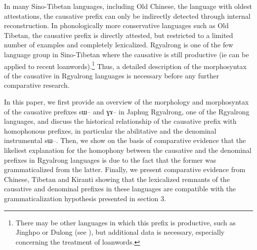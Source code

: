 \documentclass[oldfontcommands,oneside,a4paper,11pt]{article}
\newcommand{\ipa}[1]{{\phon \mbox{#1}}} %
\begin{document}
In many Sino-Tibetan languages, including Old Chinese, the  language with oldest attestations, the causative prefix can only be indirectly detected through internal reconstruction. In  phonologically more conservative languages such as Old Tibetan, the causative prefix is directly attested, but restricted to a limited number of examples and completely lexicalized. Rgyalrong is one of the few language group in Sino-Tibetan where the causative is still productive (ie can be applied to recent loanwords).\footnote{There may be other languages in which this prefix is productive, such as Jinghpo or Dulong (see \citealt[101-2]{sunhk82dulong}), but additional data is necessary, especially concerning the treatment of loanwords.} Thus, a detailed description of the morphosyntax of the causative in Rgyalrong languages is necessary before any further comparative research.

In this paper, we first provide an overview of the morphology and morphosyntax of the causative prefixes \ipa{sɯ--} and \ipa{ɣɤ--} in Japhug Rgyalrong, one of the Rgyalrong languages, and discuss the historical relationship of the causative prefix with homophonous prefixes, in particular the abilitative and the denominal instrumental \ipa{sɯ--}. Then, we show on the basis of comparative evidence that the likeliest explanation for the homophony between the causative and the denominal prefixes in Rgyalrong languages is due to the fact that the former was grammaticalized from the latter.
Finally, we present comparative evidence from Chinese, Tibetan and Kiranti showing that the lexicalized remnants of the causative and denominal prefixes in these languages are compatible with the grammaticalization hypothesis presented in section 3.

%
%
%
\end{document}
